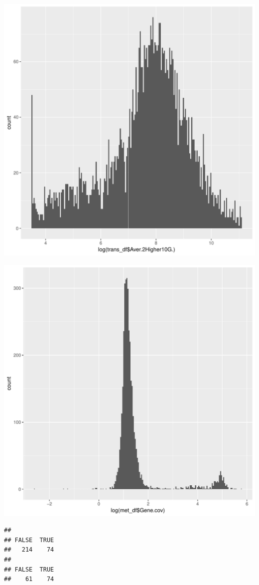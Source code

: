 \documentclass{article}\usepackage[]{graphicx}\usepackage[]{color}
\makeatletter
\def\maxwidth{ %
  \ifdim\Gin@nat@width>\linewidth
    \linewidth
  \else
    \Gin@nat@width
  \fi
}
\newenvironment{kframe}{%
 \def\at@end@of@kframe{}%
 \ifinner\ifhmode%
  \def\at@end@of@kframe{\end{minipage}}%
  \begin{minipage}{\columnwidth}%
 \fi\fi%
 \def\FrameCommand##1{\hskip\@totalleftmargin \hskip-\fboxsep
 \colorbox{shadecolor}{##1}\hskip-\fboxsep
     \hskip-\linewidth \hskip-\@totalleftmargin \hskip\columnwidth}%
 \MakeFramed {\advance\hsize-\width
   \@totalleftmargin\z@ \linewidth\hsize
   \@setminipage}}%
 {\par\unskip\endMakeFramed%
 \at@end@of@kframe}
\newenvironment{knitrout}{}{} %
\makeatother
\begin{document}
\begin{knitrout}
\color{fgcolor}
\includegraphics[width=\maxwidth]{figure/import_status_data-1} 

\includegraphics[width=\maxwidth]{figure/import_status_data-2} 
\begin{kframe}\begin{verbatim}
## 
## FALSE  TRUE 
##   214    74
## 
## FALSE  TRUE 
##    61    74
\end{verbatim}
\end{kframe}
\end{knitrout}
\end{document}
